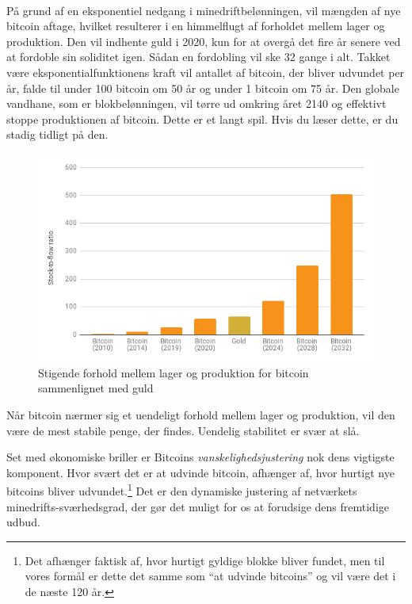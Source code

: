 \documentclass[paper=6in:9in,pagesize=pdftex,headinclude=on,footinclude=on,12pt]{scrbook}
\begin{document}
\paragraph{} På grund af en eksponentiel nedgang i minedriftbelønningen, vil mængden af nye bitcoin aftage, hvilket resulterer i en himmelflugt af forholdet mellem lager og produktion. Den vil indhente guld i 2020, kun for at overgå det fire år senere ved at fordoble sin soliditet igen. Sådan en fordobling vil ske 32 gange i alt. Takket være eksponentialfunktionens kraft vil antallet af bitcoin, der bliver udvundet per år, falde til under 100 bitcoin om 50 år og under 1 bitcoin om 75 år. Den globale vandhane, som er blokbelønningen, vil tørre ud omkring året 2140 og effektivt stoppe produktionen af bitcoin. Dette er et langt spil. Hvis du læser dette, er du stadig tidligt på den.\begin{figure}
  \includegraphics{assets/images/soundness-over-time.png}
  \caption{Stigende forhold mellem lager og produktion for bitcoin sammenlignet med guld}
  \label{fig:soundness-over-time}
\end{figure}

Når bitcoin nærmer sig et uendeligt forhold mellem lager og produktion, vil den være de mest stabile penge, der findes. Uendelig stabilitet er svær at slå.

Set med økonomiske briller er Bitcoins \textit{vanskelighedsjustering} nok dens vigtigste komponent. Hvor svært det er at udvinde bitcoin, afhænger af, hvor hurtigt nye bitcoins bliver udvundet.\footnote{Det afhænger faktisk af, hvor hurtigt gyldige blokke bliver fundet, men til vores formål er dette det samme som \enquote{at udvinde bitcoins} og vil være det i de næste 120 år.} Det er den dynamiske justering af netværkets minedrifts-sværhedsgrad, der gør det muligt for os at forudsige dens fremtidige udbud.
\end{document}
